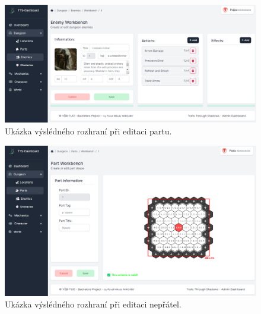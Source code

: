 \begin{figure}
    \centering
    \includegraphics[width=1.0\textwidth]{figures/dashboardWorkbenchPart}
    \caption{Ukázka výslédného rozhraní při editaci partu.}
    \label{fig:interfaceScreenshotsWorkbench}
\end{figure}

\begin{figure}
    \centering
    \includegraphics[width=1.0\textwidth]{figures/dashboardWorkbenchEnemy}
    \caption{Ukázka výslédného rozhraní při editaci nepřátel.}
    \label{fig:interfaceScreenshotsWorkbench2}
\end{figure}

\endinput